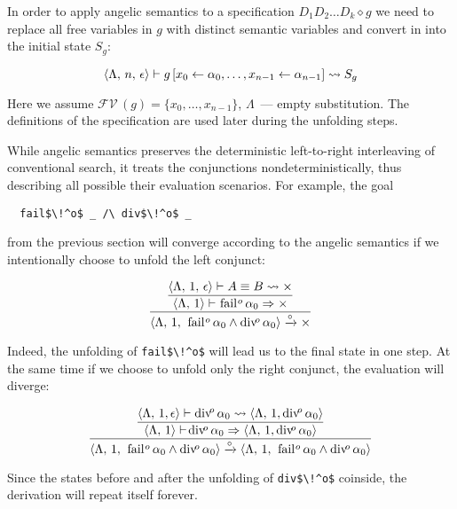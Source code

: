 In order to apply angelic semantics to a specification $D_1 D_2\ldots D_k \diamond g$ we need to replace all free variables in $g$ with distinct semantic
variables and convert in into the initial state $S_g$:

\[
\langle \Lambda,\, n,\, \epsilon \rangle \vdash g\,[x_0 \leftarrow \alpha_0, \ldots, x_{n-1} \leftarrow \alpha_{n-1}] \leadsto S_g
\]

Here we assume $\mathcal{FV}\,(g)=\{x_0,\dots,x_{n-1}\}$, $\Lambda$~--- empty substitution. The definitions of the specification are used later during the unfolding steps.

While angelic semantics preserves the deterministic left-to-right interleaving of conventional \mk search, it treats the conjunctions nondeterministically, thus
describing all possible their evaluation scenarios. For example, the goal

\begin{lstlisting}
  fail$\!^o$ _ /\ div$\!^o$ _
\end{lstlisting}

from the previous section will converge according to the angelic semantics if we intentionally choose to unfold the left conjunct:

\[
\dfrac
{\dfrac
{\inbr{\Lambda, \, 1,\, \epsilon} \vdash A \equiv B \leadsto \times}
{\inbr{\Lambda,\, 1} \vdash\! \mbox{\lstinline|fail|}\!^o\, \alpha_0  \Rightarrow \times}}
{\inbr{\Lambda,\, 1, \, \mbox{\lstinline|fail|}\!^o\, \alpha_0 \land \mbox{\lstinline|div|}\!^o\, \alpha_0} \xrightarrow{\circ} \times}
\]

Indeed, the unfolding of  \lstinline|fail$\!^o$| will lead us to the final state in one step. At the same time if we choose to unfold only the right conjunct, the
evaluation will diverge:

\[
\dfrac
{\dfrac
{\inbr{\Lambda, \, 1, \epsilon} \vdash \mbox{\lstinline|div|}\!^o\, \alpha_0 \leadsto \inbr{\Lambda, \, 1, \mbox{\lstinline|div|}\!^o\, \alpha_0}}
{\inbr{\Lambda,\, 1} \vdash\! \mbox{\lstinline|div|}\!^o\, \alpha_0  \Rightarrow \inbr{\Lambda, \, 1, \mbox{\lstinline|div|}\!^o\, \alpha_0}}}
{\inbr{\Lambda, \, 1, \, \mbox{\lstinline|fail|}\!^o\, \alpha_0 \land \mbox{\lstinline|div|}\!^o\, \alpha_0} \xrightarrow{\circ} \inbr{\Lambda, \, 1, \, \mbox{\lstinline|fail|}\!^o\, \alpha_0 \land \mbox{\lstinline|div|}\!^o\, \alpha_0}}
\]

Since the states before and after the unfolding of \lstinline|div$\!^o$| coinside, the derivation will repeat itself forever.

